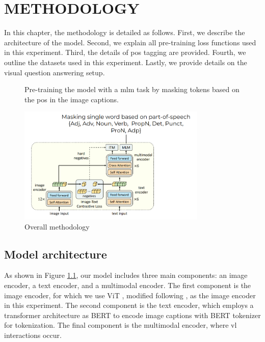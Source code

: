 \chapter{METHODOLOGY}
In this chapter, the methodology is detailed as follows. 
First, we describe the architecture of the model. 
Second, we explain all pre-training loss functions used in this experiment.
Third, the details of \acrshort{pos} tagging are provided. 
Fourth, we outline the datasets used in this experiment. 
Lastly, we provide details on the visual question answering setup.

\begin{figure}[h]
    \caption{Overall methodology}
    \label{fig:overview}
    Pre-training the model with a \acrshort{mlm} task by masking tokens based on the \acrshort{pos} in the image captions.
    \begin{center}
        \includegraphics[width=0.8\textwidth]{Images/overview.png}
    \end{center}
    \small
\end{figure}

\section{Model architecture}
As shown in Figure \ref{fig:overview}, our model includes three main components: an image encoder, a text encoder, and a multimodal encoder. 
The first component is the image encoder, for which we use ViT \cite{vit}, modified following \cite{clip}, as the image encoder in this experiment. 
The second component is the text encoder, which employs a transformer architecture as BERT \cite{bert} to encode image captions with BERT tokenizer for tokenization.
The final component is the multimodal encoder, where \acrshort{vl} interactions occur.

